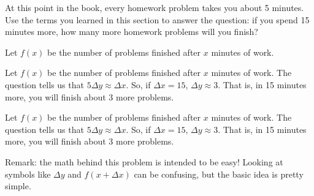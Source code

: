 \begin{Mquestion}
At this point in the book, every homework problem takes you about 5 minutes. Use the terms you learned in this section to answer the question: if you spend 15 minutes more, how many more homework problems will you finish?
\end{Mquestion}
\begin{hint}
Let $f(x)$ be the number of problems finished after $x$ minutes of work.
\end{hint}
\begin{answer}
Let $f(x)$ be the number of problems finished after $x$ minutes of work.
The question tells us that $5\Delta y \approx \Delta x$. So, if $\Delta x = 15$, $\Delta y \approx 3$. That is, in 15 minutes more, you will finish about 3 more problems.
\end{answer}
\begin{solution}
Let $f(x)$ be the number of problems finished after $x$ minutes of work.
The question tells us that $5\Delta y \approx \Delta x$. So, if $\Delta x = 15$, $\Delta y \approx 3$. That is, in 15 minutes more, you will finish about 3 more problems.

Remark: the math behind this problem is intended to be easy! Looking at symbols like $\Delta y$ and $f\left(x+\Delta x\right)$ can be confusing, but the basic idea is pretty simple.
\end{solution}



\subsection*{\Procedural}


